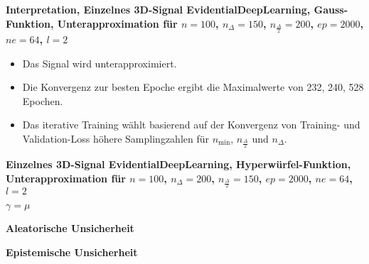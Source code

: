 \begin{otherlanguage}{ngerman}
\begin{samepage}
\begin{minipage}{\textwidth}

\noindent\textbf{Interpretation, Einzelnes 3D-Signal \gls{EvidentialDeepLearning}, Gauss-Funktion,
Unterapproximation für $n=100$, $n_{\Delta}=150$, $n_{\frac{\Delta}{2}}=200$, $ep=2000$, $ne=64$, $l=2$}

\begin{itemize}
    \item Das Signal wird unterapproximiert.
    \item Die Konvergenz zur besten Epoche ergibt die Maximalwerte von 232, 240, 528 Epochen.
    \item Das iterative Training wählt basierend auf der Konvergenz von Training- und Validation-Loss höhere Samplingzahlen für $n_{\min}$, $n_{\frac{\Delta}{2}}$ und $n_{\Delta}$.
\end{itemize}




\end{minipage}
\end{samepage}





\begin{samepage}
\begin{minipage}{\textwidth}

\noindent\textbf{Einzelnes 3D-Signal \gls{EvidentialDeepLearning}, Hyperwürfel-Funktion,
Unterapproximation für $n=100$, $n_{\Delta}=200$, $n_{\frac{\Delta}{2}}=150$, $ep=2000$, $ne=64$, $l=2$}


\begin{minipage}{0.05\textwidth}\vspace{0.5cm}\end{minipage}%
\begin{minipage}{0.3\textwidth}\centering \textbf{$\gamma=\mu$}\end{minipage}%
\begin{minipage}{0.3\textwidth}\centering \textbf{Aleatorische Unsicherheit}\end{minipage}%
\begin{minipage}{0.3\textwidth}\centering \textbf{Epistemische Unsicherheit}\end{minipage}


\end{minipage}
\end{samepage}
\end{otherlanguage}
